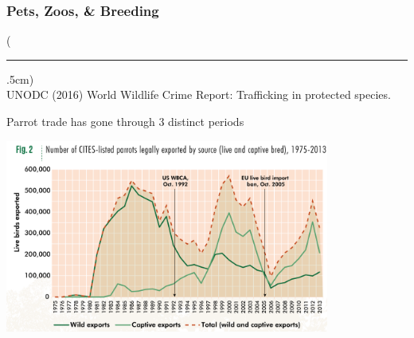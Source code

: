 \documentclass[10pt]{beamer}
\newenvironment{reference}[2]{%
	\begin{textblock*}{\textwidth}(#1,#2)
		\tiny\bgroup\color{gray}}{\egroup\end{textblock*}}
\begin{document}
\begin{frame}[t]
\frametitle{Pets, Zoos, \& Breeding}
\vspace{0.5cm}

	\begin{reference}{4mm}{92mm}
		\rule{1.5cm}{0.25pt}\\
		UNODC (2016) World Wildlife Crime Report: Trafficking in protected species.
	\end{reference}
	
	Parrot trade has gone through 3 distinct periods\\
	
	\vspace{0.5cm}
	
	\begin{center}
		\includegraphics[width=0.8\textwidth]{figures/parrot_periods.png}
	\end{center}
\end{frame}	
\end{document}
